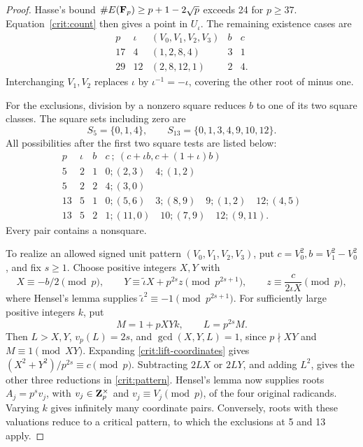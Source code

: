 \begin{proof}
Hasse's bound \(\#E(\mathbf F_p)\ge p+1-2\sqrt p\)
\cite{silverman2009} exceeds 24 for \(p\ge37\).
Equation~\eqref{crit:count} then gives a point in \(U_\iota\).
The remaining existence cases are
\[
\begin{array}{c|c|c|c|c}
p&\iota&(V_0,V_1,V_2,V_3)&b&c\\\hline
17&4&(1,2,8,4)&3&1\\
29&12&(2,8,12,1)&2&4.
\end{array}
\]
Interchanging \(V_1,V_2\) replaces \(\iota\) by
\(\iota^{-1}=-\iota\), covering the other root of minus one.

For the exclusions, division by a nonzero square reduces \(b\) to
one of its two square classes. The square sets including zero are
\[
 S_5=\{0,1,4\},\qquad S_{13}=\{0,1,3,4,9,10,12\}.
\]
All possibilities after the first two square tests are listed below:
\[
\begin{array}{c|c|c|l}
p&\iota&b&c\ ;\ (c+\iota b,c+(1+\iota)b)\\\hline
5&2&1&0;(2,3)\quad4;(1,2)\\
5&2&2&4;(3,0)\\
13&5&1&0;(5,6)\quad3;(8,9)\quad9;(1,2)\quad12;(4,5)\\
13&5&2&1;(11,0)\quad10;(7,9)\quad12;(9,11).
\end{array}
\]
Every pair contains a nonsquare.

To realize an allowed signed unit pattern \((V_0,V_1,V_2,V_3)\),
put \(c=V_0^2,b=V_1^2-V_0^2\), and fix \(s\ge1\).
Choose positive integers \(X,Y\) with
\begin{equation}\label{crit:lift-coordinates}
 X\equiv-b/2\pmod p,\qquad
 Y\equiv\widetilde\iota X+p^{2s}z\pmod{p^{2s+1}},\qquad
 z\equiv\frac{c}{2\iota X}\pmod p,
\end{equation}
where Hensel's lemma supplies
\(\widetilde\iota^2\equiv-1\pmod{p^{2s+1}}\).
For sufficiently large positive integers \(k\), put
\begin{equation}\label{crit:lift-denominator}
 M=1+pXYk,\qquad L=p^{2s}M.
\end{equation}
Then \(L>X,Y\), \(v_p(L)=2s\), and \(\gcd(X,Y,L)=1\), since
\(p\nmid XY\) and \(M\equiv1\pmod{XY}\).
Expanding \eqref{crit:lift-coordinates} gives
\((X^2+Y^2)/p^{2s}\equiv c\pmod p\).
Subtracting \(2LX\) or \(2LY\), and adding \(L^2\), gives the
other three reductions in \eqref{crit:pattern}.
Hensel's lemma now supplies roots \(A_j=p^sv_j\), with
\(v_j\in\mathbf Z_p^\times\) and \(v_j\equiv V_j\pmod p\), of the four
original radicands. Varying \(k\) gives infinitely many coordinate
pairs. Conversely, roots with these valuations reduce to a critical
pattern, to which the exclusions at 5 and 13 apply.
\end{proof}

